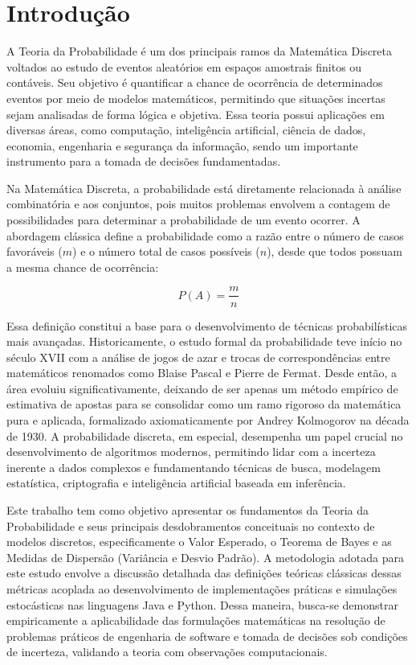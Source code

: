 \section{Introdução}
\label{cap:introducao}

A Teoria da Probabilidade é um dos principais ramos da Matemática Discreta voltados ao
estudo de eventos aleatórios em espaços amostrais finitos ou contáveis. Seu objetivo é
quantificar a chance de ocorrência de determinados eventos por meio de modelos
matemáticos, permitindo que situações incertas sejam analisadas de forma lógica e objetiva.
Essa teoria possui aplicações em diversas áreas, como computação, inteligência artificial,
ciência de dados, economia, engenharia e segurança da informação, sendo um importante
instrumento para a tomada de decisões fundamentadas.

Na Matemática Discreta, a probabilidade está diretamente relacionada à análise combinatória
e aos conjuntos, pois muitos problemas envolvem a contagem de possibilidades para
determinar a probabilidade de um evento ocorrer. A abordagem clássica define a
probabilidade como a razão entre o número de casos favoráveis ($m$) e o número total de
casos possíveis ($n$), desde que todos possuam a mesma chance de ocorrência:

\[ P(A)=\frac{m}{n} \]

Essa definição constitui a base para o desenvolvimento de técnicas probabilísticas mais avançadas.
Historicamente, o estudo formal da probabilidade teve início no século XVII com a análise de jogos de azar e trocas de correspondências entre matemáticos renomados como Blaise Pascal e Pierre de Fermat. Desde então, a área evoluiu significativamente, deixando de ser apenas um método empírico de estimativa de apostas para se consolidar como um ramo rigoroso da matemática pura e aplicada, formalizado axiomaticamente por Andrey Kolmogorov na década de 1930. A probabilidade discreta, em especial, desempenha um papel crucial no desenvolvimento de algoritmos modernos, permitindo lidar com a incerteza inerente a dados complexos e fundamentando técnicas de busca, modelagem estatística, criptografia e inteligência artificial baseada em inferência.

Este trabalho tem como objetivo apresentar os fundamentos da Teoria da Probabilidade e seus principais desdobramentos conceituais no contexto de modelos discretos, especificamente o Valor Esperado, o Teorema de Bayes e as Medidas de Dispersão (Variância e Desvio Padrão). A metodologia adotada para este estudo envolve a discussão detalhada das definições teóricas clássicas dessas métricas acoplada ao desenvolvimento de implementações práticas e simulações estocásticas nas linguagens Java e Python. Dessa maneira, busca-se demonstrar empiricamente a aplicabilidade das formulações matemáticas na resolução de problemas práticos de engenharia de software e tomada de decisões sob condições de incerteza, validando a teoria com observações computacionais.

